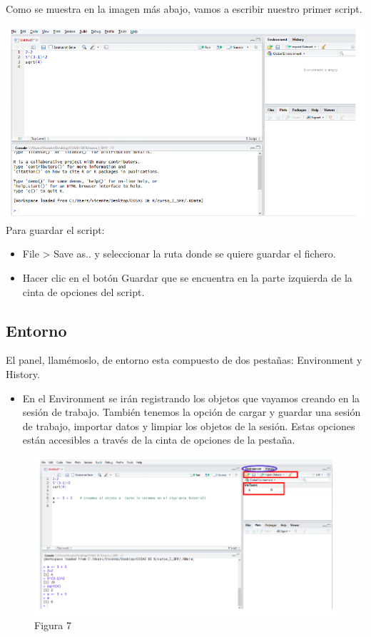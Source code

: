 \documentclass[
]{book}
\providecommand{\tightlist}{%
  \setlength{\itemsep}{0pt}\setlength{\parskip}{0pt}}
\begin{document}
Como se muestra en la imagen más abajo, vamos a escribir nuestro primer script.

\includegraphics{imagenes/07.png}
Para guardar el script:

\begin{itemize}
\item
  File \textgreater{} Save as.. y seleccionar la ruta donde se quiere guardar el fichero.
\item
  Hacer clic en el botón Guardar que se encuentra en la parte izquierda de la cinta de opciones del script.
\end{itemize}

\hypertarget{entorno}{%
\subsection{Entorno}\label{entorno}}

El panel, llamémoslo, de entorno esta compuesto de dos pestañas: Environment y History.

\begin{itemize}
\tightlist
\item
  En el Environment se irán registrando los objetos que vayamos creando en la sesión de trabajo. También tenemos la opción de cargar y guardar una sesión de trabajo, importar datos y limpiar los objetos de la sesión. Estas opciones están accesibles a través de la cinta de opciones de la pestaña.
\end{itemize}

\begin{figure}
\centering
\includegraphics{imagenes/08.png}
\caption{Figura 7}
\end{figure}
\end{document}
